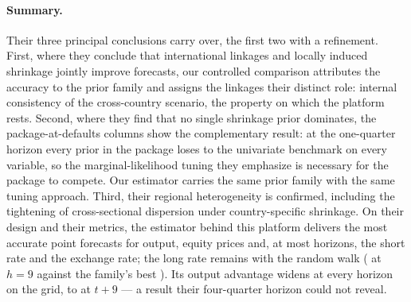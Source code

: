 \paragraph{Summary.} Their three principal conclusions carry over, the first two with a
refinement. First, where they conclude that international linkages and locally induced
shrinkage jointly improve forecasts, our controlled comparison attributes the accuracy to
the prior family and assigns the linkages their distinct role: internal consistency of
the cross-country scenario, the property on which the platform rests. Second, where they
find that no single shrinkage prior dominates, the package-at-defaults columns show the
complementary result: at the one-quarter horizon every prior in the package loses to the
univariate benchmark on every variable, so the marginal-likelihood tuning they emphasize
is necessary for the package to compete. Our estimator carries the same prior family with
the same tuning approach. Third, their regional heterogeneity is confirmed, including the
tightening of cross-sectional dispersion under country-specific shrinkage. On their
design and their metrics, the estimator behind this platform delivers the most accurate
point forecasts for output, equity prices and, at most horizons, the short rate and the
exchange rate; the long rate remains with the random walk (\CmRwLrHNine{} at $h=9$
against the family's best \CmGbvarLrHNine{}). Its output advantage widens at every
horizon on the grid, to \CmGbvarYHNine{} at $t+9$ --- a result their four-quarter horizon
could not reveal.
